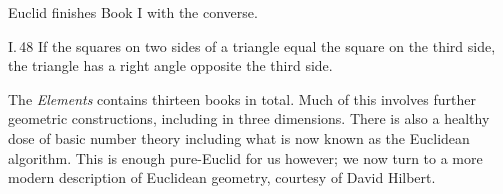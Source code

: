 Euclid finishes Book I with the converse.

\begin{thm}{I.\,48}{}
If the squares on two sides of a triangle equal the square on the third side, the  triangle has a right angle opposite the third side.
\end{thm}

The \emph{Elements} contains thirteen books in total. Much of this involves further geometric constructions, including in three dimensions. There is also a healthy dose of basic number theory including what is now known as the Euclidean algorithm. This is enough pure-Euclid for us however; we now turn to a more modern description of Euclidean geometry, courtesy of David Hilbert.

\clearpage

% 
% 
% 
% 
% 
% 
% 


